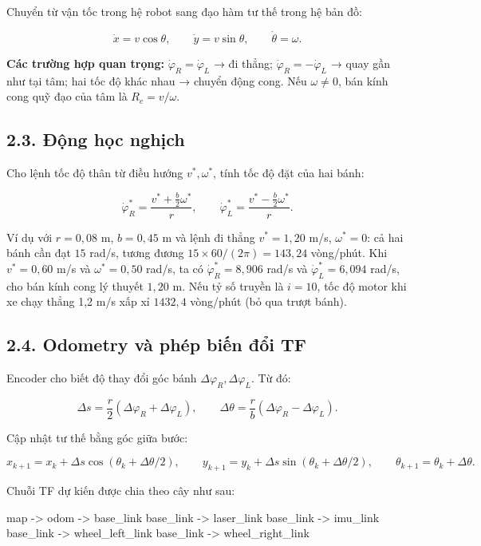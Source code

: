 \documentclass[
  12pt,
  a4paper,
]{article}
\newenvironment{Shaded}{}{}
\newcommand{\NormalTok}[1]{#1}
\begin{document}
Chuyển từ vận tốc trong hệ robot sang đạo hàm tư thế trong hệ bản đồ:

\[
\dot{x}=v\cos\theta,\qquad
\dot{y}=v\sin\theta,\qquad
\dot{\theta}=\omega.
\]

\textbf{Các trường hợp quan trọng:} \(\dot{\varphi}_R=\dot{\varphi}_L\)
→ đi thẳng; \(\dot{\varphi}_R=-\dot{\varphi}_L\) → quay gần như tại tâm;
hai tốc độ khác nhau → chuyển động cong. Nếu \(\omega\neq0\), bán kính
cong quỹ đạo của tâm là \(R_c=v/\omega\).

\subsection{2.3. Động học
nghịch}\label{ux111ux1ed9ng-hux1ecdc-nghux1ecbch}

Cho lệnh tốc độ thân từ điều hướng \(v^*,\omega^*\), tính tốc độ đặt của
hai bánh:

\[
\boxed{\dot{\varphi}_R^*=\frac{v^*+\tfrac b2\omega^*}{r}},\qquad
\boxed{\dot{\varphi}_L^*=\frac{v^*-\tfrac b2\omega^*}{r}}.
\]

Ví dụ với \(r=0,08\) m, \(b=0,45\) m và lệnh đi thẳng \(v^*=1,20\) m/s,
\(\omega^*=0\): cả hai bánh cần đạt \(15\) rad/s, tương đương
\(15\times60/(2\pi)=143,24\) vòng/phút. Khi \(v^*=0,60\) m/s và
\(\omega^*=0,50\) rad/s, ta có \(\dot{\varphi}_R^*=8,906\) rad/s và
\(\dot{\varphi}_L^*=6,094\) rad/s, cho bán kính cong lý thuyết \(1,20\)
m. Nếu tỷ số truyền là \(i=10\), tốc độ motor khi xe chạy thẳng 1,2 m/s
xấp xỉ \(1432,4\) vòng/phút (bỏ qua trượt bánh).

\subsection{2.4. Odometry và phép biến đổi
TF}\label{odometry-vuxe0-phuxe9p-biux1ebfn-ux111ux1ed5i-tf}

Encoder cho biết độ thay đổi góc bánh
\(\Delta\varphi_R,\Delta\varphi_L\). Từ đó:

\[
\Delta s=\frac r2(\Delta\varphi_R+\Delta\varphi_L),\qquad
\Delta\theta=\frac rb(\Delta\varphi_R-\Delta\varphi_L).
\]

Cập nhật tư thế bằng góc giữa bước:

\[
x_{k+1}=x_k+\Delta s\cos(\theta_k+\Delta\theta/2),\qquad
 y_{k+1}=y_k+\Delta s\sin(\theta_k+\Delta\theta/2),\qquad
\theta_{k+1}=\theta_k+\Delta\theta.
\]

Chuỗi TF dự kiến được chia theo cây như sau:

\begin{Shaded}
\begin{Highlighting}[]
\NormalTok{map {-}\textgreater{} odom {-}\textgreater{} base\_link}
\NormalTok{base\_link {-}\textgreater{} laser\_link}
\NormalTok{base\_link {-}\textgreater{} imu\_link}
\NormalTok{base\_link {-}\textgreater{} wheel\_left\_link}
\NormalTok{base\_link {-}\textgreater{} wheel\_right\_link}
\end{Highlighting}
\end{Shaded}
\end{document}
